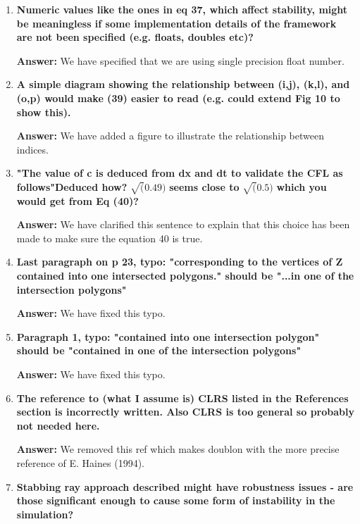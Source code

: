\documentclass{article}
\newcommand{\answer}[1]{\textbf{\textcolor{answercolor}{Answer:}} \textcolor{answercolor}{#1}}
\begin{document}
\begin{enumerate}[label=\textbf{\arabic*.}]
	      \answer{Indeed this formulation is more clear. We replace our piecewise definition with this one.}

	\item \textbf{Numeric values like the ones in eq 37, which affect stability, might be meaningless if some implementation details of the framework are not been specified (e.g. floats, doubles etc)?}

	      \answer{We have specified that we are using single precision float number.}

	\item \textbf{A simple diagram showing the relationship between (i,j), (k,l), and (o,p) would make (39) easier to read (e.g. could extend Fig 10 to show this).}

	      \answer{We have added a figure to illustrate the relationship between indices.}

	\item \textbf{"The value of c is deduced from dx and dt to validate the CFL as follows"Deduced how? }$\mathbf{\sqrt(0.49)}$\textbf{ seems close to }$\mathbf{\sqrt(0.5)}$\textbf{ which you would get from Eq (40)?}

	      \answer{We have clarified this sentence to explain that this choice has been made to make sure the equation 40 is true.}


	\item \textbf{Last paragraph on p 23, typo: "corresponding to the vertices of Z contained into one intersected polygons." should be "...in one of the intersection polygons"}

	      \answer{We have fixed this typo.}



	\item \textbf{Paragraph 1, typo: "contained into one intersection polygon" should be "contained in one of the intersection polygons"}

	      \answer{We have fixed this typo.}


	\item \textbf{The reference to (what I assume is) CLRS listed in the References section is incorrectly written. Also CLRS is too general so probably not needed here.}

	      \answer{We removed this ref which makes doublon with the more precise reference of E. Haines (1994).}

	\item \textbf{Stabbing ray approach described might have robustness issues - are those significant enough to cause some form of instability in the simulation?}


\end{enumerate}
\end{document}
